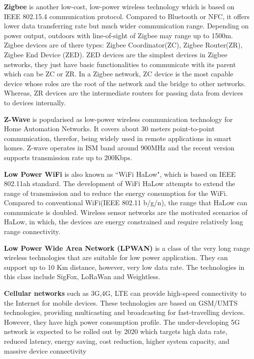 \textbf{Zigbee} is another low-cost, low-power wireless technology which is based on IEEE 802.15.4 communication protocol.
Compared to Bluetooth or NFC, it offers lower data transferring rate but  much wider communication range.
Depending on power output, outdoors with line-of-sight of Zigbee may range up to 1500m.
Zigbee devices are of there types: Zigbee Coordinator(ZC), Zigbee Router(ZR), Zigbee End Device (ZED).
ZED devices are the simplest devices in Zigbee networks, they just have basic functionalities to communicate with its parent which can be ZC or ZR. 
In a Zigbee network, ZC device is the most capable device whose roles are the root of the network and the bridge to other networks.
Whereas, ZR devices are the intermediate routers for passing data from devices to devices internally. 

\textbf{Z-Wave} is popularised as low-power wireless communication technology for Home Automation Networks.
It covers about 30 meters point-to-point communication, therefor, being widely used in remote applications in smart homes.
Z-wave operates in ISM band around 900MHz and the recent version supports transmission rate up to 200Kbps.

\textbf{Low Power WiFi} is also known as ``WiFi HaLow", which is based on IEEE 802.11ah standard.
The development of WiFi HaLow attempts to extend the range of transmission and to reduce the energy consumption for the WiFi.
Compared to conventional WiFi(IEEE 802.11 b/g/n), the range that HaLow can communicate is doubled.
Wireless sensor networks are the motivated scenarios of HaLow, in which, the devices are energy constrained and require relatively long range connectivity. 

\textbf{Low Power Wide Area Network (LPWAN)}  is a class of the very long range wireless technologies that are suitable for low power application. They can support up to 10 Km distance, however, very low data rate. The technologies in this class include SigFox, LoRaWan and Weightless. 

\textbf{Cellular networks} such as 3G,4G, LTE can provide high-speed connectivity to the Internet for mobile devices. These technologies are based on GSM/UMTS technologies, providing multicasting and broadcasting for fast-travelling devices.
However, they have high power consumption profile.
The under-developing 5G network is expected to be rolled out by 2020 which targets high data rate, reduced latency, energy saving, cost reduction, higher system capacity, and massive device connectivity

